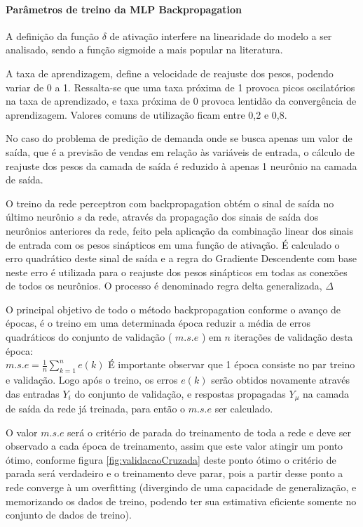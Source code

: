     \paragraph*{Parâmetros de treino da MLP Backpropagation}
    A definição da função $\delta$ de ativação interfere na linearidade  do modelo a ser analisado, sendo a função sigmoide a mais popular na literatura. 
    
    A taxa de aprendizagem, define a velocidade de reajuste dos pesos, podendo variar de 0 a 1. Ressalta-se que uma taxa próxima de 1 provoca picos oscilatórios na taxa de aprendizado, e taxa próxima de 0 provoca lentidão da convergência de aprendizagem. Valores comuns de utilização ficam entre 0,2 e 0,8.
    
    No caso do problema de predição de demanda onde se busca apenas um valor de saída, que é a previsão de vendas em relação às variáveis de entrada, o cálculo de reajuste dos pesos da camada de saída é reduzido à apenas 1 neurônio na camada de saída.
    
    O treino da rede perceptron com backpropagation obtém o sinal de saída no último neurônio $s$ da rede, através da propagação dos sinais de saída dos neurônios anteriores da rede, feito pela aplicação da combinação linear dos sinais de entrada com os pesos sinápticos em uma função de ativação. É calculado o erro quadrático deste sinal de saída e a regra do Gradiente Descendente com base neste erro é utilizada para o reajuste dos pesos sinápticos em todas as conexões de todos os neurônios. O processo é denominado regra delta generalizada, $\Delta$
    
    O principal objetivo de todo o método backpropagation conforme o avanço de épocas, é o treino em uma determinada época reduzir a média de erros quadráticos do conjunto de validação ( $m.s.e$ ) em $n$ iterações de validação desta época:\\
    $m.s.e = \frac{1}{n} \sum_{k=1}^{n}e(k)$
    É importante observar que 1 época consiste no par treino e validação. Logo após o treino, os erros $e(k)$ serão obtidos novamente através das entradas $Y_i$ do conjunto de validação, e respostas propagadas $Y_\mu$ na camada de saída da rede já treinada, para então o $m.s.e$ ser calculado.
    
    O valor $m.s.e$ será o critério de parada do treinamento de toda a rede e deve ser observado a cada época de treinamento, assim que este valor atingir um ponto ótimo, conforme figura \ref{fig:validacaoCruzada} deste ponto ótimo o critério de parada será verdadeiro e o treinamento deve parar, pois a partir desse ponto a rede converge à um overfitting (divergindo de uma capacidade de generalização, e memorizando os dados de treino, podendo ter sua estimativa eficiente somente no conjunto de dados de treino).
    
